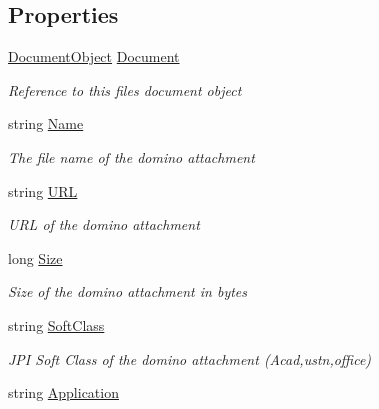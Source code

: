\subsection*{Properties}
\begin{DoxyCompactItemize}
\item 
\mbox{\hyperlink{class_document_object}{Document\+Object}} \mbox{\hyperlink{class_file_object_a0c9650a6ae1efb95f8211f9fa3b883fe}{Document}}
\begin{DoxyCompactList}\small\item\em Reference to this files document object \end{DoxyCompactList}\item 
string \mbox{\hyperlink{class_file_object_a9d47aff166393cb47490da2661576d62}{Name}}
\begin{DoxyCompactList}\small\item\em The file name of the domino attachment \end{DoxyCompactList}\item 
string \mbox{\hyperlink{class_file_object_a7355eaeea3fe40bd8862d7f1f9b479da}{U\+RL}}
\begin{DoxyCompactList}\small\item\em U\+RL of the domino attachment \end{DoxyCompactList}\item 
long \mbox{\hyperlink{class_file_object_a7aa7737c1ce05f4424ba16dded444949}{Size}}
\begin{DoxyCompactList}\small\item\em Size of the domino attachment in bytes \end{DoxyCompactList}\item 
string \mbox{\hyperlink{class_file_object_a5e9b8f083b53ea0450a0560c16292a2f}{Soft\+Class}}
\begin{DoxyCompactList}\small\item\em J\+PI Soft Class of the domino attachment (Acad,ustn,office) \end{DoxyCompactList}\item 
string \mbox{\hyperlink{class_file_object_a39640cdc4b16ee66e9c73803f4510396}{Application}}

\end{DoxyCompactItemize}
